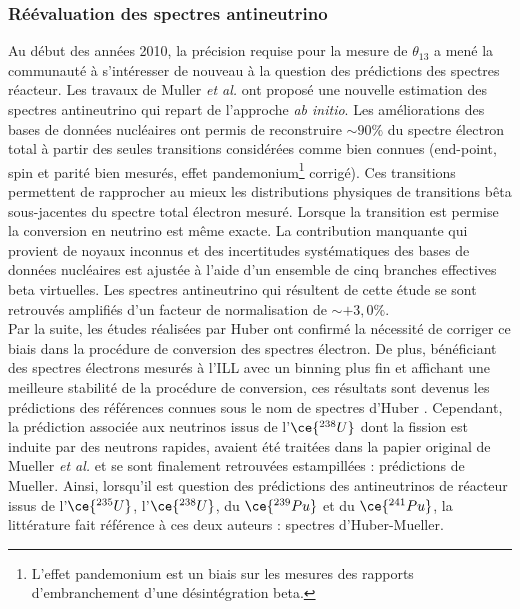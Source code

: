\bigbreak

\subsubsection*{Réévaluation des spectres antineutrino}

Au début des années 2010, la précision requise pour la mesure de $\theta_{13}$ a mené la communauté à s'intéresser de nouveau à la question des prédictions des spectres réacteur. Les travaux de Muller \textit{et al.} \cite{Mueller:2011nm} ont proposé une nouvelle estimation des spectres antineutrino qui repart de l'approche \textit{ab initio}. Les améliorations des bases de données nucléaires ont permis de reconstruire $\sim 90\%$ du spectre électron total à partir des seules transitions considérées comme  \og bien connues \fg{} (end-point, spin et parité bien mesurés, effet pandemonium\footnote{L'effet pandemonium est un 	biais sur les mesures des rapports d'embranchement d'une désintégration beta.} corrigé). Ces transitions permettent de rapprocher au mieux les distributions physiques de transitions bêta sous-jacentes du spectre total électron mesuré. Lorsque la transition est permise la conversion en neutrino est même exacte. La contribution manquante qui provient de noyaux inconnus et des incertitudes systématiques des bases de données nucléaires est ajustée à l'aide d'un ensemble de cinq branches effectives beta virtuelles. Les spectres antineutrino qui résultent de cette étude se sont retrouvés amplifiés d'un facteur de normalisation de $\sim +3,0 \%$. \\


Par la suite, les études réalisées par Huber \cite{Huber:2011wv} ont confirmé la nécessité de corriger ce biais dans la procédure de conversion des spectres électron. De plus, bénéficiant des spectres électrons mesurés à l'ILL avec un binning plus fin et affichant une meilleure stabilité de la procédure de conversion, ces résultats sont devenus les prédictions des références connues sous le nom de \og spectres d'Huber \fg{}. Cependant, la prédiction associée aux neutrinos issus de l'$\ce{^{238}U}$ dont la fission est induite par des neutrons rapides, avaient été traitées dans la papier original de Mueller \textit{et al.} et se sont finalement retrouvées estampillées : prédictions de Mueller. Ainsi, lorsqu'il est question des prédictions des antineutrinos de réacteur issus de l'$\ce{^{235}U}$, l'$\ce{^{238}U}$, du $\ce{^{239}Pu}$ et du $\ce{^{241}Pu}$, la littérature fait référence à ces deux auteurs : spectres d'Huber-Mueller.\\

